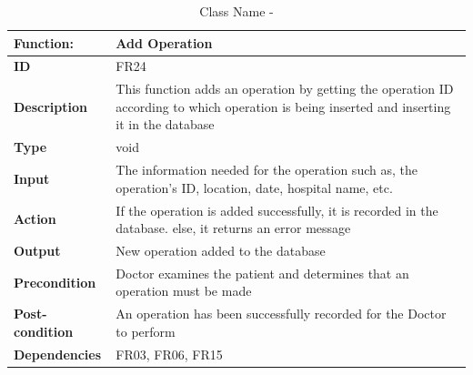 \documentclass[]{article}
\begin{document}
\FloatBarrier
\begin{table}[h]
\caption{Class Name - }
\label{tab:my-table}
\begin{tabular}{|p{}|p{}|}
\hline
\textbf{Function:} & Add Operation
\\ \hline
\textbf{ID}  & FR24         

\\ \hline
\textbf{Description}    &  This function adds an operation by getting the operation ID according to which operation is being inserted and inserting it in the database                                                               
\\ \hline
\textbf{Type}    & void    

\\ \hline
\textbf{Input}        & The information needed for the operation such as, the operation's ID, location, date, hospital name, etc.


\\ \hline
\textbf{Action}            &  If the operation is added successfully, it is recorded in the database. else, it returns an error message

\\ \hline
\textbf{Output}            & New operation added to the database

\\ \hline
\textbf{Precondition}           &  Doctor examines the patient and determines that an operation must be made

\\ \hline
\textbf{Post-condition}           & An operation has been successfully recorded for the Doctor to perform


\\ \hline
\textbf{Dependencies}           & FR03, FR06, FR15
\\ \hline
\end{tabular}
\end{table}
\end{document}
